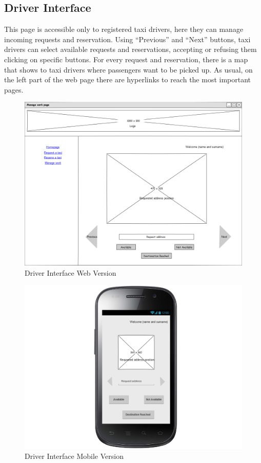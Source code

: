 \subsection{Driver Interface}
This page is accessible only to registered taxi drivers, here they can manage incoming requests and reservation. Using ``Previous'' and ``Next'' buttons, taxi drivers can select available requests and reservations, accepting or refusing them clicking on specific buttons. For every request and reservation, there is a map that shows to taxi drivers where passengers want to be picked up. \newline As usual, on the left part of the web page there are hyperlinks to reach the most important pages.
\begin{figure}[H]
\centering
\includegraphics[scale=0.35]{mockups/manage_work_web.png}
\caption{Driver Interface Web Version}
\end{figure}
\begin{figure}[H]
\centering
\includegraphics[scale=0.35]{mockups/manage_work_mobile.png}
\caption{Driver Interface Mobile Version}
\end{figure}
\break
